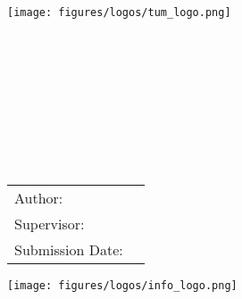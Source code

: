 \begin{titlepage}
    \makeatletter
    \begin{center}
        \texttt{[image: figures/logos/tum\_logo.png]}\\[0.5cm]
        \begin{Huge}
            \MakeUppercase{\getFaculty}
        \end{Huge}\\[0.5cm]
        \begin{large}
            \MakeUppercase{\getUniversity}
        \end{large}\\[2cm]
        \begin{Large}
            \getDoctype%
        \end{Large}\\[1.cm]
        \begin{Huge}
            \@title\par
        \end{Huge}\\[1cm]
        \begin{Huge}
            \texttt{\getTitleGer{}}\par
        \end{Huge}\\[1.5cm]
        \begin{tabular}{l l}
            Author:          & \getAuthor{} \\
            Supervisor:      & \getSupervisor{} \\
            Submission Date: & \getSubmissionDate{} \\
        \end{tabular}
        \vfill
        \texttt{[image: figures/logos/info\_logo.png]}\\
    \end{center}
    \makeatother
\end{titlepage}
